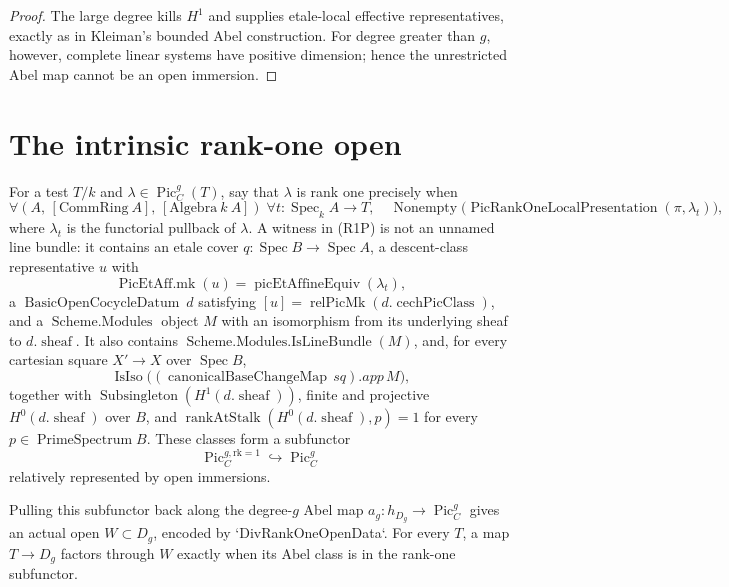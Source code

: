 \begin{proof}
  The large degree kills \(H^1\) and supplies etale-local effective
  representatives, exactly as in Kleiman's bounded Abel construction.  For
  degree greater than \(g\), however, complete linear systems have positive
  dimension; hence the unrestricted Abel map cannot be an open immersion.
\end{proof}

\section{The intrinsic rank-one open}

\begin{theorem}
  \label{route-thm-rank-one-open}
  \leanok

  For a test \(T/k\) and
  \(\lambda\in\operatorname{Pic}^{g}_C(T)\), say that \(\lambda\) is
  rank one precisely when
  \[
    \forall(A,\,[\mathrm{CommRing}\ A],\,[\mathrm{Algebra}\ k\ A])\;
    \forall t:\operatorname{Spec}_k A\longrightarrow T,\quad
    \operatorname{Nonempty}\bigl(\operatorname{PicRankOneLocalPresentation}
      (\pi,\lambda_t)\bigr),
    \tag{R1P}
  \]
  where \(\lambda_t\) is the functorial pullback of \(\lambda\).  A witness
  in (R1P) is not an unnamed line bundle: it contains an etale cover
  \(q:\operatorname{Spec}B\to\operatorname{Spec}A\), a descent-class
  representative \(u\) with
  \[
    \operatorname{PicEtAff.mk}(u)=\operatorname{picEtAffineEquiv}(\lambda_t),
  \]
  a \(\operatorname{BasicOpenCocycleDatum}\ d\) satisfying
  \([u]=\operatorname{relPicMk}(d.\operatorname{cechPicClass})\), and a
  \(\operatorname{Scheme.Modules}\) object \(M\) with an isomorphism from
  its underlying sheaf to \(d.\operatorname{sheaf}\).  It also contains
  \(\operatorname{Scheme.Modules.IsLineBundle}(M)\), and, for every cartesian
  square \(X'\to X\) over \(\operatorname{Spec}B\),
  \[
    \operatorname{IsIso}\bigl((\operatorname{canonicalBaseChangeMap}\,sq).app\,M\bigr),
  \]
  together with \(\operatorname{Subsingleton}(H^1(d.\operatorname{sheaf}))\),
  finite and projective \(H^0(d.\operatorname{sheaf})\) over \(B\), and
  \(\operatorname{rankAtStalk}(H^0(d.\operatorname{sheaf}),p)=1\) for every
  \(p\in\operatorname{PrimeSpectrum}B\).  These classes form a subfunctor
  \[
    \operatorname{Pic}^{g,\mathrm{rk}=1}_C
       \hookrightarrow \operatorname{Pic}^{g}_C
  \]
  relatively represented by open immersions.

  Pulling this subfunctor back along the degree-\(g\) Abel map
  \(a_g:h_{D_g}\to\operatorname{Pic}^{g}_C\) gives an actual open
  \(W\subset D_g\), encoded by `DivRankOneOpenData`.  For every \(T\), a
  map \(T\to D_g\) factors through \(W\) exactly when its Abel class is in
  the rank-one subfunctor.
\end{theorem}

